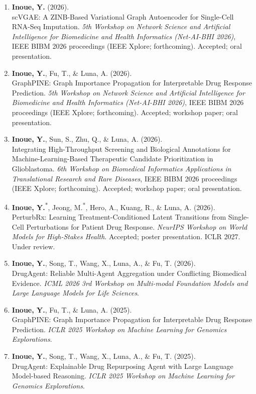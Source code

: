 \documentclass[11pt]{article}
\newcommand{\publication}[3]{%
  \entryspace\item #1\\
  #2. #3
}
\begin{document}
\begin{enumerate}[label={C\arabic*.}]

  \publication
  {\textbf{Inoue, Y.} (2026).}
  {scVGAE: A ZINB-Based Variational Graph Autoencoder for Single-Cell RNA-Seq Imputation}
  {\textit{5th Workshop on Network Science and Artificial Intelligence for Biomedicine and Health Informatics (Net-AI-BHI 2026)}, IEEE BIBM 2026 proceedings (IEEE Xplore; forthcoming). Accepted; oral presentation.}
  \publication
  {\textbf{Inoue, Y.}, Fu, T., \& Luna, A. (2026).}
  {GraphPINE: Graph Importance Propagation for Interpretable Drug Response Prediction}
  {\textit{5th Workshop on Network Science and Artificial Intelligence for Biomedicine and Health Informatics (Net-AI-BHI 2026)}, IEEE BIBM 2026 proceedings (IEEE Xplore; forthcoming). Accepted; workshop paper; oral presentation.}

  \publication
  {\textbf{Inoue, Y.}, Sun, S., Zhu, Q., \& Luna, A. (2026).}
  {Integrating High-Throughput Screening and Biological Annotations for Machine-Learning-Based Therapeutic Candidate Prioritization in Glioblastoma}
  {\textit{6th Workshop on Biomedical Informatics Applications in Translational Research and Rare Diseases}, IEEE BIBM 2026 proceedings (IEEE Xplore; forthcoming). Accepted; workshop paper; oral presentation.}

  \publication
  {\textbf{Inoue, Y.}\textsuperscript{*}, Jeong, M.\textsuperscript{*}, Hero, A., Kuang, R., \& Luna, A. (2026).}
  {PerturbRx: Learning Treatment-Conditioned Latent Transitions from Single-Cell Perturbations for Patient Drug Response}
  {\textit{NeurIPS Workshop on World Models for High-Stakes Health}. Accepted; poster presentation. ICLR 2027. Under review.}

  \publication
  {\textbf{Inoue, Y.}, Song, T., Wang, X., Luna, A., \& Fu, T. (2026).}
  {DrugAgent: Reliable Multi-Agent Aggregation under Conflicting Biomedical Evidence}
  {\textit{ICML 2026 3rd Workshop on Multi-modal Foundation Models and Large Language Models for Life Sciences}.}

  \publication
  {\textbf{Inoue, Y.}, Fu, T., \& Luna, A. (2025).}
  {GraphPINE: Graph Importance Propagation for Interpretable Drug Response Prediction}
  {\textit{ICLR 2025 Workshop on Machine Learning for Genomics Explorations}.}

  \publication
  {\textbf{Inoue, Y.}, Song, T., Wang, X., Luna, A., \& Fu, T. (2025).}
  {DrugAgent: Explainable Drug Repurposing Agent with Large Language Model-based Reasoning}
  {\textit{ICLR 2025 Workshop on Machine Learning for Genomics Explorations}.}

\end{enumerate}
\end{document}
